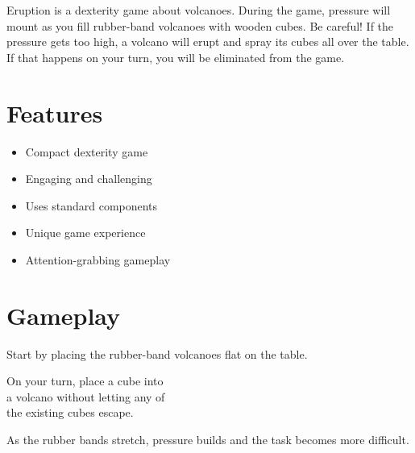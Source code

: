\documentclass[a5paper, DIV=18, 12pt]{scrartcl}
\begin{document}
\vspace{-0.25ex}
\flushleft
Eruption is a dexterity game about volcanoes. During the game, pressure will mount as you fill rubber-band volcanoes with wooden cubes. Be careful! If the pressure gets too high, a volcano will erupt and spray its cubes all over the table. If that happens on your turn, you will be eliminated from the game. 
\flushleft
\vspace{-0ex}
\begin{multicols}{2}
\section*{\textcolor{eruption_purple}{Features}}
%
%
\begin{itemize}[leftmargin=*, nosep]
\item Compact dexterity game
\vspace{0.9ex}
\item Engaging and challenging
\vspace{0.9ex}
\item Uses standard components
\vspace{0.9ex}
\item Unique game experience
\vspace{0.9ex}
\item Attention-grabbing gameplay
\end{itemize}

\section*{\textcolor{eruption_purple}{Gameplay}}
Start by placing the rubber-band volcanoes flat on the table.

\vspace{1.25ex}

On your turn, place a cube into\\a volcano without letting any of\\the existing cubes escape.

\vspace{1.25ex}

As the rubber bands stretch, pressure builds and the task becomes more difficult.


\end{multicols}
\end{document}
